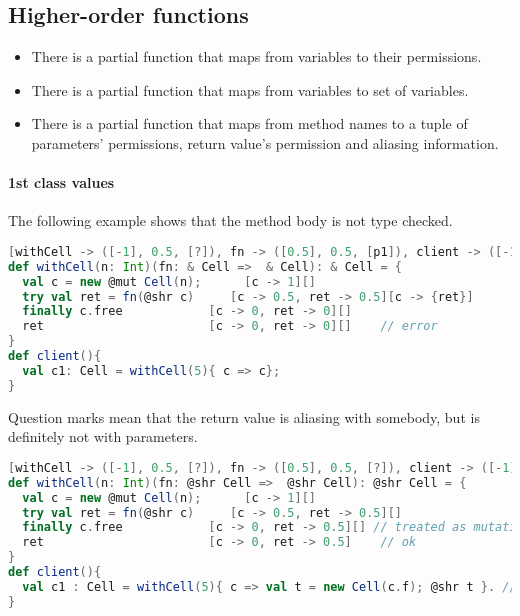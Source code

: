 \clearpage
\subsection{Higher-order functions}
\begin{itemize}
\item There is a partial function  that maps from variables to their permissions.
\item There is a partial function  that maps from variables to set of variables. 
\item There is a partial function  that maps from method names to a tuple of parameters' permissions,  return value's permission and aliasing information.
\end{itemize}

\paragraph{1st class values}

The following example shows that the method body is not type checked. 
\begin{lstlisting}[language=Scala,basicstyle=\footnotesize\ttfamily]
[withCell -> ([-1], 0.5, [?]), fn -> ([0.5], 0.5, [p1]), client -> ([-1], -1, [])]
def withCell(n: Int)(fn: & Cell =>  & Cell): & Cell = {
  val c = new @mut Cell(n);      [c -> 1][]
  try val ret = fn(@shr c)     [c -> 0.5, ret -> 0.5][c -> {ret}]  
  finally c.free            [c -> 0, ret -> 0][]
  ret                       [c -> 0, ret -> 0][]    // error
}
def client(){
  val c1: Cell = withCell(5){ c => c};
}
\end{lstlisting}

Question marks mean that the return value is aliasing with somebody, but is definitely not with parameters.
\begin{lstlisting}[language=Scala,basicstyle=\footnotesize\ttfamily]
[withCell -> ([-1], 0.5, [?]), fn -> ([0.5], 0.5, [?]), client -> ([-1], -1, [])]
def withCell(n: Int)(fn: @shr Cell =>  @shr Cell): @shr Cell = {
  val c = new @mut Cell(n);      [c -> 1][]
  try val ret = fn(@shr c)     [c -> 0.5, ret -> 0.5][]  
  finally c.free            [c -> 0, ret -> 0.5][] // treated as mutation
  ret                       [c -> 0, ret -> 0.5]    // ok
}
def client(){
  val c1 : Cell = withCell(5){ c => val t = new Cell(c.f); @shr t }. // unsafe
}
\end{lstlisting}

